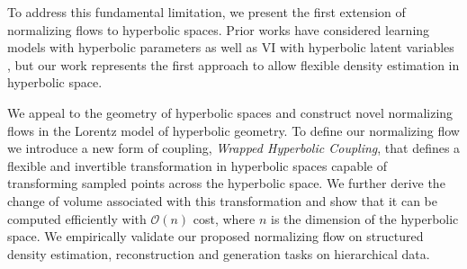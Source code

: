 

To address this fundamental limitation, we present the first extension of normalizing flows to hyperbolic spaces. 
Prior works have considered learning models with hyperbolic parameters  \cite{liu2019hyperbolic,nickel2018learning} as well as VI with hyperbolic latent variables \cite{nagano2019wrapped,mathieu2019continuous}, but our work represents the first approach to allow flexible density estimation in hyperbolic space. 

We appeal to the geometry of hyperbolic spaces and construct novel normalizing flows in the Lorentz model of hyperbolic geometry. 
To define our normalizing flow we introduce a new form of coupling, {\em Wrapped Hyperbolic Coupling}, that defines a flexible and invertible transformation in hyperbolic spaces capable of transforming sampled points across the hyperbolic space. 
We further derive the change of volume associated with this transformation and show that it can be computed efficiently with $\mathcal{O}(n)$ cost, where $n$ is the dimension of the hyperbolic space.
We empirically validate our proposed normalizing flow on structured density estimation, reconstruction and generation tasks on hierarchical data. 

